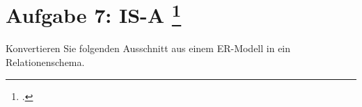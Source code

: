 \documentclass{bschlangaul-aufgabe}
\begin{document}

\section{Aufgabe 7: IS-A
\footcite{db:ab:klausurvorbereitung}}

Konvertieren Sie folgenden Ausschnitt aus einem ER-Modell in ein
Relationenschema.
\end{document}

